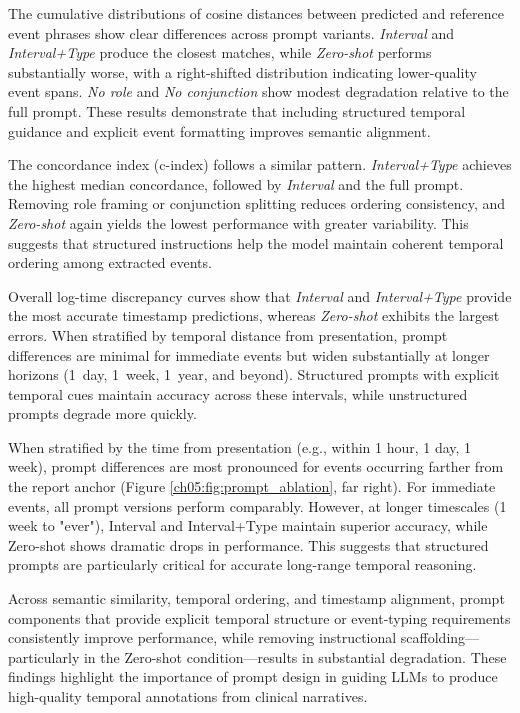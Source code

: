 The cumulative distributions of cosine distances between predicted and reference event phrases show clear differences across prompt variants. \emph{Interval} and \emph{Interval+Type} produce the closest matches, while \emph{Zero-shot} performs substantially worse, with a right-shifted distribution indicating lower-quality event spans. \emph{No role} and \emph{No conjunction} show modest degradation relative to the full prompt.
These results
demonstrate that including structured temporal guidance and explicit event formatting improves semantic alignment.

The concordance index (c-index) follows a similar pattern. \emph{Interval+Type} achieves the highest median concordance, followed by \emph{Interval} and the full prompt.
Removing role
framing or conjunction splitting reduces ordering consistency, and \emph{Zero-shot} again yields the lowest performance with greater variability.
This suggests that structured instructions help the model maintain coherent temporal ordering among extracted events.

Overall log-time discrepancy curves show that \emph{Interval} and \emph{Interval+Type} provide the most accurate timestamp predictions, whereas \emph{Zero-shot} exhibits the largest errors.
When stratified by temporal distance from presentation, prompt differences are minimal for
immediate events but widen substantially at longer horizons (1~day, 1~week, 1~year, and beyond).
Structured prompts with explicit temporal cues maintain accuracy across these
intervals, while unstructured prompts degrade more quickly.

When stratified by the time from presentation (e.g., within 1 hour, 1 day, 1 week), prompt differences are most pronounced for events occurring farther from the report anchor (Figure \ref{ch05:fig:prompt_ablation}, far right).
For immediate events, all prompt versions perform comparably.
However, at longer timescales (1 week to "ever"), Interval and Interval+Type maintain superior accuracy, while Zero-shot shows dramatic drops in performance.
This suggests that structured prompts are particularly critical for accurate long-range temporal reasoning.

Across semantic similarity, temporal ordering, and timestamp alignment, prompt components that provide explicit temporal structure or event-typing requirements consistently improve
performance, while removing instructional scaffolding—particularly in the Zero-shot condition—results in substantial degradation.
These findings highlight the importance of prompt
design in guiding LLMs to produce high-quality temporal annotations from clinical narratives.

